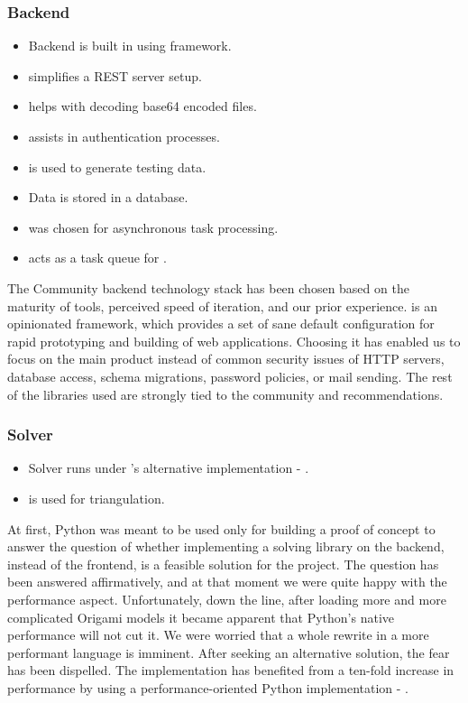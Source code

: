 \subsubsection{Backend}

\begin{itemize}
	\item Backend is built in  using  framework. 
	\item {} simplifies a REST server setup.
	\item {} helps with decoding base64 encoded files.
	\item {} assists in authentication processes.
	\item {} is used to generate testing data.
	\item Data is stored in a  database.
	\item {} was chosen for asynchronous task processing.
	\item {} acts as a task queue for .
\end{itemize}

The Community backend technology stack has been chosen based on the maturity of tools, perceived speed of iteration, and our prior experience.  is an opinionated framework, which provides a set of sane default configuration for rapid prototyping and building of web applications. Choosing it has enabled us to focus on the main product instead of common security issues of HTTP servers, database access, schema migrations, password policies, or mail sending. The rest of the libraries used are strongly tied to the  community and recommendations.

\subsubsection{Solver}

\begin{itemize}
	\item Solver runs under 's alternative implementation - .
	\item {} is used for triangulation.
\end{itemize}

At first, Python was meant to be used only for building a proof of concept to answer the question of whether implementing a solving library on the backend, instead of the frontend, is a feasible solution for the project. The question has been answered affirmatively, and at that moment we were quite happy with the performance aspect. Unfortunately, down the line, after loading more and more complicated Origami models it became apparent that Python's native performance will not cut it. We were worried that a whole rewrite in a more performant language is imminent. After seeking an alternative solution, the fear has been dispelled. The implementation has benefited from a ten-fold increase in performance by using a performance-oriented Python implementation - .



